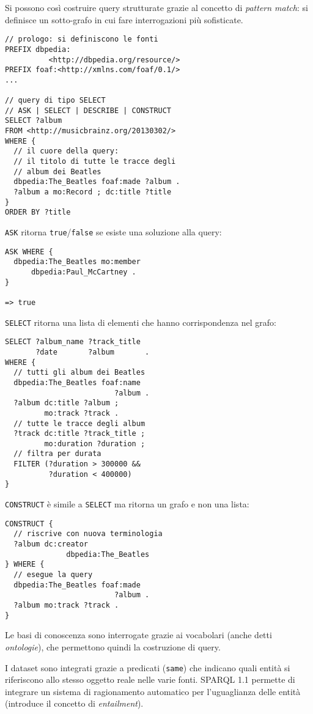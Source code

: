 \documentclass[11pt, twocolumn]{article}
\begin{document}
Si possono così costruire query strutturate grazie al concetto di \textit{pattern match}: si definisce un sotto-grafo in cui fare interrogazioni più sofisticate.

\begin{verbatim}
// prologo: si definiscono le fonti
PREFIX dbpedia:
          <http://dbpedia.org/resource/>
PREFIX foaf:<http://xmlns.com/foaf/0.1/>
...

// query di tipo SELECT
// ASK | SELECT | DESCRIBE | CONSTRUCT
SELECT ?album
FROM <http://musicbrainz.org/20130302/>
WHERE {
  // il cuore della query:
  // il titolo di tutte le tracce degli
  // album dei Beatles
  dbpedia:The_Beatles foaf:made ?album .
  ?album a mo:Record ; dc:title ?title
}
ORDER BY ?title
\end{verbatim}

\verb|ASK| ritorna \verb|true|/\verb|false| se esiste una soluzione alla query:
\begin{verbatim}
ASK WHERE {
  dbpedia:The_Beatles mo:member
      dbpedia:Paul_McCartney .
}

=> true
\end{verbatim}

\verb|SELECT| ritorna una lista di elementi che hanno corrispondenza nel grafo:
\begin{verbatim}
SELECT ?album_name ?track_title
       ?date       ?album       .
WHERE {
  // tutti gli album dei Beatles
  dbpedia:The_Beatles foaf:name
                         ?album .
  ?album dc:title ?album ;
         mo:track ?track .
  // tutte le tracce degli album
  ?track dc:title ?track_title ;
         mo:duration ?duration ;
  // filtra per durata
  FILTER (?duration > 300000 &&
          ?duration < 400000)
}
\end{verbatim}

\verb|CONSTRUCT| è simile a \verb|SELECT| ma ritorna un grafo e non una lista:
\begin{verbatim}
CONSTRUCT {
  // riscrive con nuova terminologia
  ?album dc:creator
              dbpedia:The_Beatles
} WHERE {
  // esegue la query
  dbpedia:The_Beatles foaf:made
                         ?album .
  ?album mo:track ?track .
}
\end{verbatim}

Le basi di conoscenza sono interrogate grazie ai vocabolari (anche detti \textit{ontologie}), che permettono quindi la costruzione di query.

I dataset sono integrati grazie a predicati (\verb|same|) che indicano quali entità si riferiscono allo stesso oggetto reale nelle varie fonti.
SPARQL 1.1 permette di integrare un sistema di ragionamento automatico per l'uguaglianza delle entità (introduce il concetto di \textit{entailment}).
\end{document}
